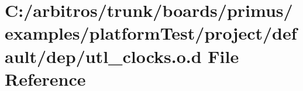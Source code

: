 \hypertarget{platform_test_2project_2default_2dep_2utl__clocks_8o_8d}{\section{C\-:/arbitros/trunk/boards/primus/examples/platform\-Test/project/default/dep/utl\-\_\-clocks.o.\-d File Reference}
\label{platform_test_2project_2default_2dep_2utl__clocks_8o_8d}
}
